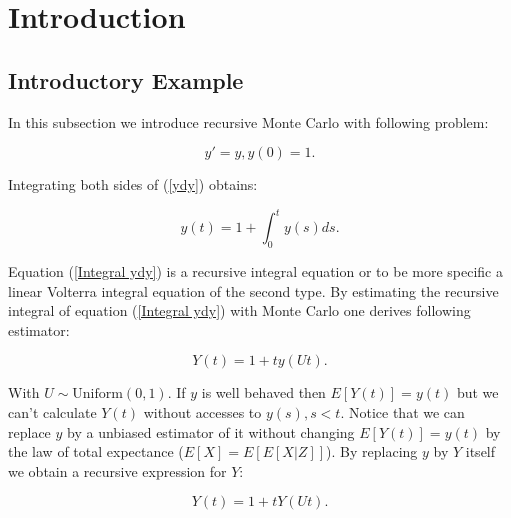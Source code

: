 \documentclass[a4paper,12pt]{article}
\begin{document}

\newpage
\tableofcontents
\newpage

\begin{abstract}
    We will write this at the end. Also need a dutch abstract
\end{abstract}

\section{Introduction}

\subsection{Introductory Example}
In this subsection we introduce recursive  Monte Carlo with following problem:

\begin{equation} \label{ydy}
    y'=y, y(0)=1.
\end{equation}

Integrating both sides of (\ref{ydy}) obtains:

\begin{equation} \label{Integral ydy}
    y(t) = 1 + \int_{0}^{t} y(s) ds.
\end{equation}

Equation (\ref{Integral ydy}) is a recursive integral equation or to be more specific
a linear Volterra integral equation of the second type. By estimating the recursive integral
of equation (\ref{Integral ydy}) with Monte Carlo one derives following estimator:

\[
    Y(t) = 1 + t y(Ut)
    .\]

With $U \sim \text{Uniform}(0,1)$. If $y$ is well behaved then $E[Y(t)]=y(t)$ but we can't
calculate $Y(t)$ without accesses to $y(s),s<t$. Notice that we can replace $y$ by a
unbiased estimator of it without changing $E[Y(t)]=y(t)$ by the law of total expectance
($E[X] = E[E[X|Z]]$). By replacing $y$ by $Y$ itself we obtain a recursive expression for $Y$:

\begin{equation}\label{recursive RV}
    Y(t) = 1 + tY(Ut).
\end{equation}
\end{document}
